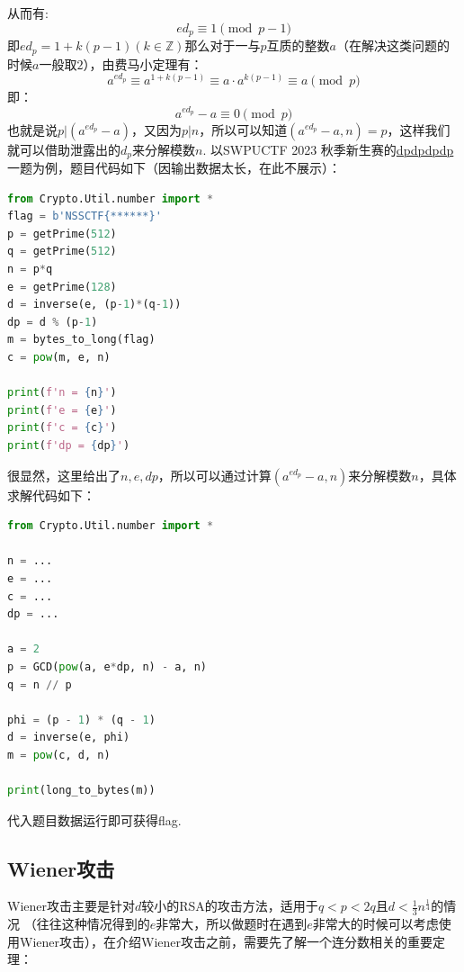 \documentclass{book}
\numberwithin{equation}{subsubsection}
\begin{document}
从而有:
\begin{equation}
    ed_p\equiv 1\pmod{p-1}
    \nonumber
\end{equation}
即$ed_p=1+k(p-1)(k\in\mathbb{Z})$那么对于一与$p$互质的整数$a$（在解决这类问题的时候$a$一般取$2$），由费马小定理有：
\begin{equation}
    a^{ed_p}\equiv a^{1+k(p-1)}\equiv a\cdot a^{k(p-1)}\equiv a\pmod{p}
    \nonumber
\end{equation}
即：
\begin{equation}
    a^{ed_p}-a\equiv 0\pmod{p}
    \nonumber
\end{equation}
也就是说$p|(a^{ed_p}-a)$，又因为$p|n$，所以可以知道$(a^{ed_p}-a, n)=p$，这样我们就可以借助泄露出的$d_p$来分解模数$n$.
以SWPUCTF 2023 秋季新生赛的\href{https://www.nssctf.cn/problem/4538}{dpdpdpdp}一题为例，题目代码如下（因输出数据太长，在此不展示）：
\begin{lstlisting}[language=Python,basicstyle=\ttfamily,breaklines=true,keywordstyle=\bfseries\color{blue}]
from Crypto.Util.number import *
flag = b'NSSCTF{******}'
p = getPrime(512)
q = getPrime(512)
n = p*q
e = getPrime(128)
d = inverse(e, (p-1)*(q-1))
dp = d % (p-1)
m = bytes_to_long(flag)
c = pow(m, e, n)

print(f'n = {n}')
print(f'e = {e}')
print(f'c = {c}')
print(f'dp = {dp}')
\end{lstlisting}
很显然，这里给出了$n,e,dp$，所以可以通过计算$(a^{ed_p}-a, n)$来分解模数$n$，具体求解代码如下：
\begin{lstlisting}[language=Python,basicstyle=\ttfamily,breaklines=true,keywordstyle=\bfseries\color{blue}]
from Crypto.Util.number import *

n = ...
e = ...
c = ...
dp = ...

a = 2
p = GCD(pow(a, e*dp, n) - a, n)
q = n // p

phi = (p - 1) * (q - 1)
d = inverse(e, phi)
m = pow(c, d, n)

print(long_to_bytes(m))
\end{lstlisting}
代入题目数据运行即可获得flag.\par

\subsection{Wiener攻击\cite{10}}
Wiener攻击主要是针对$d$较小的RSA的攻击方法，适用于$q<p<2q$且$d<\frac{1}{3}n^{\frac{1}{4}}$的情况
（往往这种情况得到的$e$非常大，所以做题时在遇到$e$非常大的时候可以考虑使用Wiener攻击），在介绍Wiener攻击之前，需要先了解一个连分数相关的重要定理：
\end{document}
